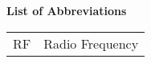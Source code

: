 \noindent\Large{\bf{List of Abbreviations}}

\vspace{24pt}

\small\normalsize

\begin{supertabular}{ll}
RF & Radio Frequency
\end{supertabular}
